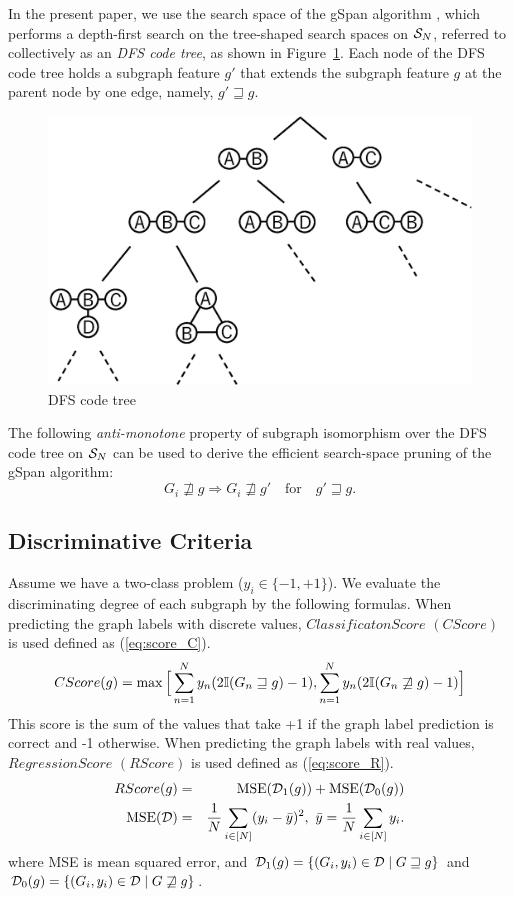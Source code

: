 In the present paper, we use the search space of the gSpan algorithm \cite{Yan:2002},
which performs a depth-first search on the tree-shaped search spaces on $\S_N$,
referred to collectively as an \textit{DFS code tree}, as shown in Figure~\ref{fig:search_tree}.
Each node of the DFS code tree holds a subgraph feature $g'$ that
extends the subgraph feature $g$ at the parent node by one edge, namely, $ g' \sqsupseteq g $.

\begin{figure}[t]
  \centering
  \includegraphics[width=0.5\linewidth]{img/search_tree.eps}
  \caption{DFS code tree}
  \label{fig:search_tree}
\end{figure}

The following \textit{anti-monotone} property of
subgraph isomorphism over the DFS code tree on $\S_N$ can be used to
derive the efficient search-space pruning of the gSpan algorithm:
\begin{equation}
  \label{eq:propSubgraph}
  G_i \not \sqsupseteq g \Rightarrow G_i \not\sqsupseteq g'
  \quad \text{for} \quad
  g' \sqsupseteq g . %
\end{equation}

\subsection{Discriminative Criteria}
\label{sec:criteria}
Assume we have a two-class problem ($y_{i} \in \{-1, +1\}$).
We evaluate the discriminating degree of each subgraph by the following formulas.
When predicting the graph labels with discrete values, $ClassificatonScore$ $(CScore)$  is used defined as (\ref{eq:score_C}).
\begin{eqnarray}
  \label{eq:score_C}
  CScore(g) = \max \Big[ \sum_{n=1}^{N} y_{n} (2\I(G_{n} \sqsupseteq g) - 1), \sum_{n=1}^{N} y_{n} (2\I(G_{n} \not\sqsupseteq g) -1) \Big]
\end{eqnarray}
This score is the sum of the values that take +1 if the graph label prediction is correct and -1 otherwise.
When predicting the graph labels with real values, $RegressionScore$ $(RScore)$ is used defined as (\ref{eq:score_R}).
\begin{eqnarray}
  \label{eq:score_R}
  RScore(g) &=& \mse(\D_1(g)) + \mse(\D_0(g)) \\
  \mse(\D) &=& \frac{1}{N} \sum_{i \in [N]}
  (y_i - \bar{y})^2, \,\, \bar{y} = \frac{1}{N} \sum_{i \in [N]} y_i. \nonumber
\end{eqnarray}
where MSE is mean squared error, and
$\D_1(g) = \{ (G_i, y_i) \in \D \mid G \sqsupseteq g \} $ and
$\D_0(g) = \{ (G_i, y_i) \in \D \mid G \not\sqsupseteq g \} $.

